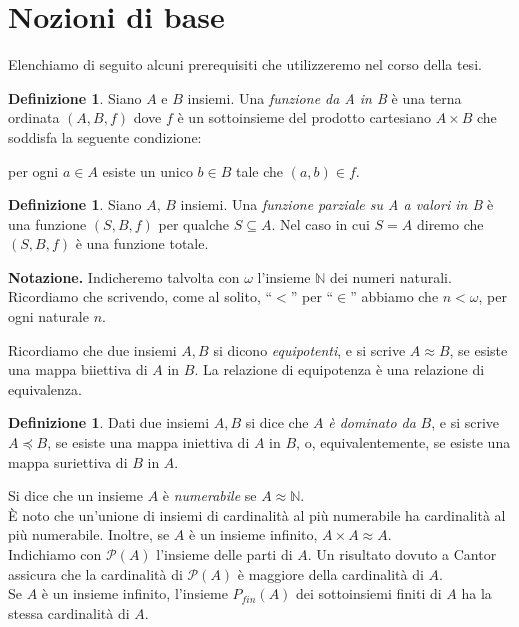 \documentclass[12pt,a4paper]{report}
\theoremstyle{definition}
\newtheorem{defn}[teo]{Definizione}  %
\begin{document}
\chapter*{Nozioni di base}


\setcounter{page}{1}


Elenchiamo di seguito alcuni prerequisiti che utilizzeremo nel corso della tesi.

\begin{defn}
Siano $A$ e $B$ insiemi. Una \emph{funzione da A in B} è una terna ordinata $(A,B,f)$ dove $f$ è un sottoinsieme del prodotto cartesiano $A \times B$ che soddisfa la seguente condizione:\\
\centerline{per ogni $a \in A$ esiste un unico $b \in B$ tale che $(a,b) \in f$.}
\end{defn}

\begin{defn}
Siano $A$, $B$ insiemi. Una \emph{funzione parziale su A a valori in B} è una funzione $(S,B,f)$ per qualche $S \subseteq A$. Nel caso in cui $S=A$ diremo che $(S,B,f)$ è una funzione totale.
\end{defn}

\noindent \textbf{Notazione.} Indicheremo talvolta con $\omega$ l'insieme $\mathbb{N}$ dei numeri naturali. Ricordiamo che scrivendo, come al solito, ``$<$'' per ``$\in$'' abbiamo che $n < \omega$, per ogni naturale $n$.

Ricordiamo che due insiemi $A,B$ si dicono \emph{equipotenti}, e si scrive $A \approx B$, se esiste una mappa biiettiva di $A$ in $B$. La relazione di equipotenza è una relazione di equivalenza.

\begin{defn}
Dati due insiemi $A,B$ si dice che $A$ \emph{è dominato da} $B$, e si scrive $A \preccurlyeq B$, se esiste una mappa iniettiva di $A$ in $B$, o, equivalentemente, se esiste una mappa suriettiva di $B$ in $A$.
\end{defn}


\noindent Si dice che un insieme $A$ è \emph{numerabile} se $A \approx \mathbb{N}$.\\
È noto che un'unione di insiemi di cardinalità al più numerabile ha cardinalità al più numerabile. Inoltre, se $A$ è un insieme infinito, $A \times A \approx A$.\\
Indichiamo con $\mathcal{P}(A)$ l'insieme delle parti di $A$. Un risultato dovuto a Cantor assicura che la cardinalità di $\mathcal{P}(A)$ è maggiore della cardinalità di $A$.\\
Se $A$ è un insieme infinito, l'insieme $P_{fin}(A)$ dei sottoinsiemi finiti di $A$ ha la stessa cardinalità di $A$.
\end{document}
